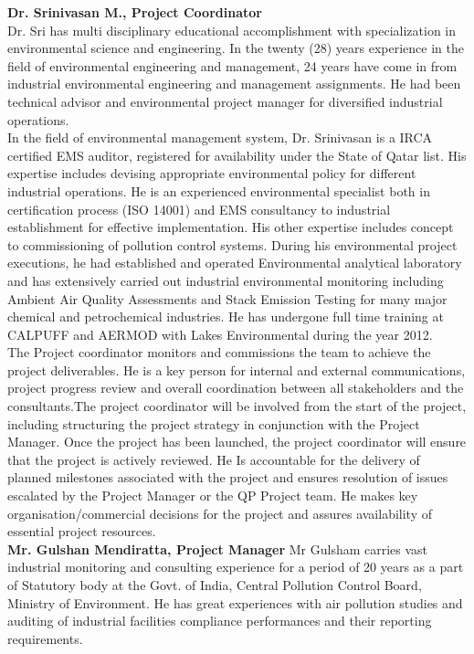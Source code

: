 \textbf{Dr. Srinivasan M., Project Coordinator }\\
Dr. Sri has multi disciplinary educational accomplishment with specialization in environmental science and engineering.  In the twenty (28) years experience in the field of environmental engineering and management, 24 years have come in from industrial environmental engineering and management assignments. He had been technical advisor and environmental project manager for diversified industrial operations. \\
In the field of environmental management system, Dr. Srinivasan is a IRCA certified EMS auditor, registered for availability under the State of Qatar list. His expertise includes devising appropriate environmental policy for different industrial operations. He is an experienced environmental specialist both in certification process (ISO 14001) and EMS consultancy to industrial establishment for effective implementation. His other expertise includes concept to commissioning of pollution control systems. During his environmental project executions, he had established and operated Environmental analytical laboratory and has extensively carried out industrial environmental monitoring including Ambient Air Quality Assessments and Stack Emission Testing for many major chemical and petrochemical industries.
He has undergone full time training at CALPUFF and AERMOD with Lakes Environmental during the year 2012.	\\
The Project coordinator monitors and commissions the team to achieve the project deliverables. He is a key person for internal and external communications, project progress review and overall coordination between all stakeholders and the consultants.The project coordinator will be involved from the start of the project, including structuring the project strategy in conjunction with the Project Manager.  Once the project has been launched, the project coordinator will ensure that the project is actively reviewed. He Is accountable for the delivery of planned milestones associated with the project and ensures resolution of issues escalated by the Project Manager or the QP Project team. He makes key organisation/commercial decisions for the project and assures availability of essential project resources.\\

\textbf{Mr. Gulshan Mendiratta, Project Manager}
Mr Gulsham carries vast industrial monitoring and consulting experience for a period of 20 years as a part of Statutory body at the Govt. of India, Central Pollution Control Board, Ministry of Environment. He has great experiences with air pollution studies and auditing of industrial facilities compliance performances and their reporting requirements.\\

